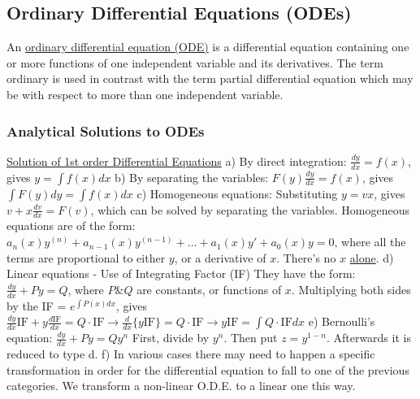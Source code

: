 \documentclass[12pt]{article}
\begin{document}
\begin{flushleft}
	\subsection{Ordinary Differential Equations (ODEs)}
	
	\textbullet \quad An \uline{ordinary differential equation (ODE)} is a differential equation containing one or more functions of one independent variable and its derivatives. The term ordinary is used in contrast with the term partial differential equation which may be with respect to more than one independent variable. \linebreak 
	
	\subsubsection{Analytical Solutions to ODEs}
	
	\uline{Solution of 1st order Differential Equations} \linebreak 
	\textbullet \quad a) By direct integration: $\displaystyle \frac{dy}{dx} = f(x) $, gives $y=\int f(x) dx$ \linebreak 
	\textbullet \quad b) By separating the variables: $\displaystyle F(y) \frac{dy}{dx} = f(x) $, gives $\int F(y) dy = \int f(x) dx $ \linebreak 
	\textbullet \quad c) Homogeneous equations: Substituting $y = v x$, gives $v + x \frac{dv}{dx} = F(v)$, which can be solved by separating the variables. \linebreak 
	Homogeneous equations are of the form: $\displaystyle a_n(x)y^{(n)} + a_{n-1}(x)y^{(n-1)} + \ldots + a_1(x)y' + a_0(x)y = 0$, where all the terms are proportional to either $y$, or a derivative of $x$. There's no $x$ \uline{alone}. \linebreak 
	\textbullet \quad d) Linear equations - Use of Integrating Factor (IF) \linebreak 
	They have the form: $\displaystyle \frac{dy}{dx} + Py = Q$, where $P \text{\&} Q$ are constants, or functions of $x$. \linebreak 
	Multiplying both sides by the IF = $\displaystyle e^{\int P(x) dx}$, gives $\displaystyle \frac{dy}{dx}\text{IF} + y \frac{d\text{IF}}{dx} = Q\cdot \text{IF} \rightarrow \frac{d}{dx} \{ y\text{IF} \} = Q \cdot \text{IF} \rightarrow y \text{IF} = \int Q \cdot \text{IF} dx $ \linebreak 
	\textbullet \quad e) Bernoulli's equation: $\displaystyle \frac{dy}{dx} + Py = Q y^n$ \linebreak 
	First, divide by $y^n$. Then put $z=y^{1-n}$. Afterwards it is reduced to type d. \linebreak 
	\textbullet \quad f) In various cases there may need to happen a specific transformation in order for the differential equation to fall to one of the previous categories. We transform a non-linear O.D.E. to a linear one this way. \linebreak 
	

\end{flushleft}
\end{document}
